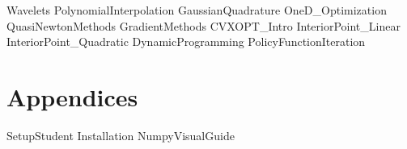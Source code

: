 \documentclass[opener-c,labs,red,nociteref]{HJnewsiambook}
\begin{document}
{Wavelets}
{PolynomialInterpolation}
{GaussianQuadrature}
{OneD_Optimization}
{QuasiNewtonMethods}
{GradientMethods}
{CVXOPT_Intro}
{InteriorPoint_Linear}
{InteriorPoint_Quadratic}
{DynamicProgramming}
{PolicyFunctionIteration}

\part{Appendices}
\begin{appendices}
{SetupStudent}
{Installation}
{NumpyVisualGuide}
\end{appendices}

% 
% 
\end{document}
